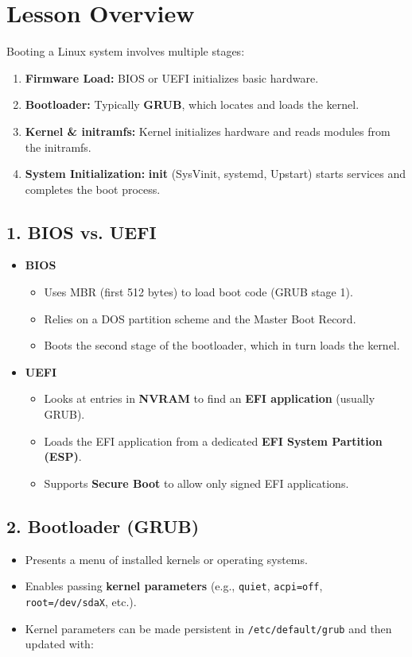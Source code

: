 \documentclass[a4paper]{report}
\begin{document}
\section*{Lesson Overview}

Booting a Linux system involves multiple stages:
\begin{enumerate}
    \item \textbf{Firmware Load:} BIOS or UEFI initializes basic hardware.
    \item \textbf{Bootloader:} Typically \textbf{GRUB}, which locates and loads the kernel.
    \item \textbf{Kernel \& initramfs:} Kernel initializes hardware and reads modules from the initramfs.
    \item \textbf{System Initialization:} \textbf{init} (SysVinit, systemd, Upstart) starts services and completes the boot process.
\end{enumerate}

\subsection*{1. BIOS vs. UEFI}
\begin{itemize}
\item\textbf{BIOS}  
\begin{itemize}
    \item Uses MBR (first 512 bytes) to load boot code (GRUB stage 1).
    \item Relies on a DOS partition scheme and the Master Boot Record.
    \item Boots the second stage of the bootloader, which in turn loads the kernel.
\end{itemize}

\item\textbf{UEFI}
\begin{itemize}
    \item Looks at entries in \textbf{NVRAM} to find an \textbf{EFI application} (usually GRUB).
    \item Loads the EFI application from a dedicated \textbf{EFI System Partition (ESP)}.
    \item Supports \textbf{Secure Boot} to allow only signed EFI applications.
\end{itemize}
\end{itemize}

\subsection*{2. Bootloader (GRUB)}
\begin{itemize}
    \item Presents a menu of installed kernels or operating systems.
    \item Enables passing \textbf{kernel parameters} (e.g., \texttt{quiet}, \texttt{acpi=off}, \texttt{root=/dev/sdaX}, etc.).
    \item Kernel parameters can be made persistent in \texttt{/etc/default/grub} and then updated with:
\end{itemize}
\end{document}
